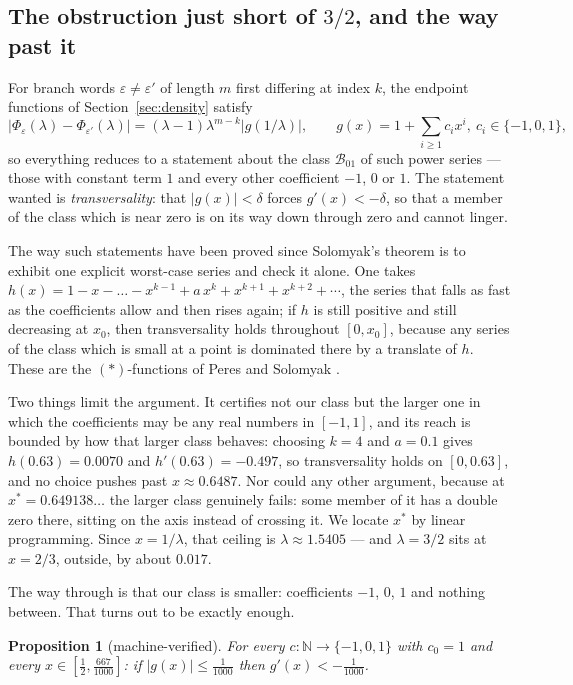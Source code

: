 \documentclass[11pt,reqno]{amsart}
\theoremstyle{plain}
\newtheorem{proposition}[theorem]{Proposition}
\theoremstyle{definition}
\theoremstyle{remark}
\begin{document}
\subsection{The obstruction just short of $3/2$, and the way past it}
For branch words $\varepsilon\neq\varepsilon'$ of length $m$ first differing at
index $k$, the endpoint functions of Section~\ref{sec:density} satisfy
\[
\bigl|\Phi_\varepsilon(\lambda)-\Phi_{\varepsilon'}(\lambda)\bigr|
=(\lambda-1)\lambda^{m-k}\bigl|g(1/\lambda)\bigr|,\qquad
g(x)=1+\textstyle\sum_{i\geq1}c_ix^i,\ c_i\in\{-1,0,1\},
\]
so everything reduces to a statement about the class $\mathcal B_{01}$ of such
power series --- those with constant term $1$ and every other coefficient
$-1$, $0$ or $1$. The statement wanted is \emph{transversality}: that
$|g(x)|<\delta$ forces $g'(x)<-\delta$, so that a member of the class which is
near zero is on its way down through zero and cannot linger.

The way such statements have been proved since Solomyak's theorem
\cite{Solomyak1995} is to exhibit one explicit worst-case series and check it
alone. One takes
$h(x)=1-x-\dots-x^{k-1}+a\,x^k+x^{k+1}+x^{k+2}+\cdots$, the series that falls
as fast as the coefficients allow and then rises again; if $h$ is still
positive and still decreasing at $x_0$, then transversality holds throughout
$[0,x_0]$, because any series of the class which is small at a point is
dominated there by a translate of $h$. These are the $(*)$-functions of
Peres and Solomyak \cite{PeresSolomyak1996}.

Two things limit the argument. It certifies not our class but the larger one
in which the coefficients may be any real numbers in $[-1,1]$, and its reach
is bounded by how that larger class behaves: choosing $k=4$ and $a=0.1$ gives
$h(0.63)=0.0070$ and $h'(0.63)=-0.497$, so transversality holds on
$[0,0.63]$, and no choice pushes past $x\approx0.6487$. Nor could any other
argument, because at $x^*=0.649138\ldots$ the larger class genuinely fails:
some member of it has a double zero there, sitting on the axis instead of
crossing it. We locate $x^*$ by linear programming. Since $x=1/\lambda$, that
ceiling is $\lambda\approx1.5405$ --- and $\lambda=3/2$ sits at $x=2/3$,
outside, by about $0.017$.

The way through is that our class is smaller: coefficients $-1$, $0$, $1$ and
nothing between. That turns out to be exactly enough.

\begin{proposition}[machine-verified]\label{prop:restricted}
For every $c:\mathbb N\to\{-1,0,1\}$ with $c_0=1$ and every
$x\in[\tfrac12,\tfrac{667}{1000}]$: if $|g(x)|\leq\tfrac1{1000}$ then
$g'(x)<-\tfrac1{1000}$.
\end{proposition}
\end{document}
